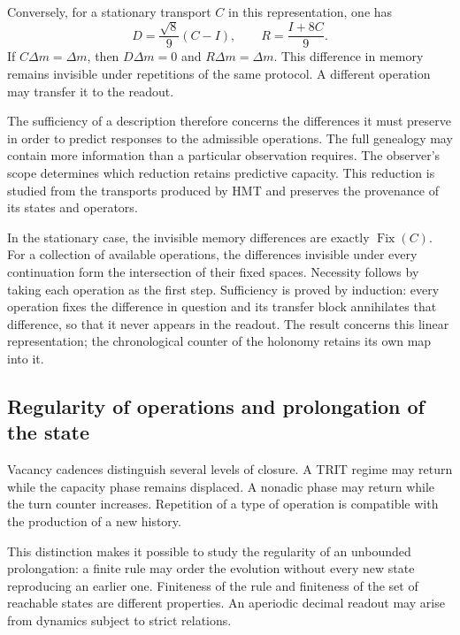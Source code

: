 Conversely, for a stationary transport $C$ in
this representation, one has
\begin{equation}
 D=\frac{\sqrt8}{9}(C-I),\qquad R=\frac{I+8C}{9}.
 \label{md:lectin:bloques-memoria}
\end{equation}
If $C\Delta m=\Delta m$, then $D\Delta m=0$ and
$R\Delta m=\Delta m$. This difference in memory remains invisible
under repetitions of the same protocol. A different operation may
transfer it to the readout.

The sufficiency of a description therefore concerns the
differences it must preserve in order to predict responses to the
admissible operations. The full genealogy may contain more
information than a particular observation requires. The
observer's scope determines which reduction retains predictive
capacity. This reduction is studied from the transports produced
by HMT and preserves the provenance of its states and operators.

In the stationary case, the invisible memory differences are
exactly $\operatorname{Fix}(C)$. For a collection of available operations,
the differences invisible under every continuation
form the intersection of their fixed spaces. Necessity follows
by taking each operation as the first step. Sufficiency is proved
by induction: every operation fixes the difference in question and
its transfer block annihilates that difference, so that it never
appears in the readout. The result concerns this linear
representation; the chronological counter of the holonomy retains its own map
into it.

\subsection{Regularity of operations and prolongation of the state}
\label{md:lectin:regularidad}

Vacancy cadences distinguish several levels of closure. A
TRIT regime may return while the capacity phase remains
displaced. A nonadic phase may return while the
turn counter increases. Repetition of a type of operation is
compatible with the production of a new history.

This distinction makes it possible to study the regularity of an
unbounded prolongation: a finite rule may order the evolution without every
new state reproducing an earlier one. Finiteness of the rule and
finiteness of the set of reachable states are different properties.
An aperiodic decimal readout may arise from dynamics subject
to strict relations.

